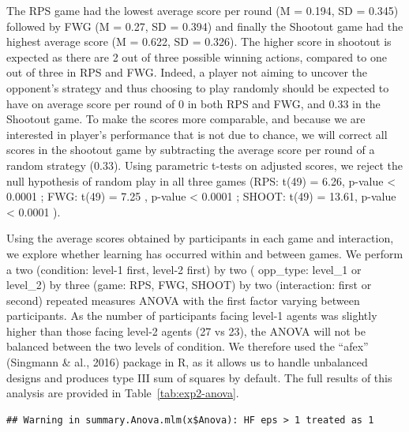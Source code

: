 \documentclass[man,floatsintext]{apa6}
\begin{document}
The RPS game had the lowest average score per round (M = 0.194, SD = 0.345) followed by FWG (M = 0.27, SD = 0.394) and finally the Shootout game had the highest average score (M = 0.622, SD = 0.326). The higher score in shootout is expected as there are 2 out of three possible winning actions, compared to one out of three in RPS and FWG. Indeed, a player not aiming to uncover the opponent's strategy and thus choosing to play randomly should be expected to have on average score per round of 0 in both RPS and FWG, and 0.33 in the Shootout game. To make the scores more comparable, and because we are interested in player's performance that is not due to chance, we will correct all scores in the shootout game by subtracting the average score per round of a random strategy (0.33). Using parametric t-tests on adjusted scores, we reject the null hypothesis of random play in all three games (RPS: t(49) = 6.26, p-value \textless{} 0.0001 ; FWG: t(49) = 7.25 , p-value \textless{} 0.0001 ; SHOOT: t(49) = 13.61, p-value \textless{} 0.0001 ).

Using the average scores obtained by participants in each game and interaction, we explore whether learning has occurred within and between games. We perform a two (condition: level-1 first, level-2 first) by two ( opp\_type: level\_1 or level\_2) by three (game: RPS, FWG, SHOOT) by two (interaction: first or second) repeated measures ANOVA with the first factor varying between participants. As the number of participants facing level-1 agents was slightly higher than those facing level-2 agents (27 vs 23), the ANOVA will not be balanced between the two levels of condition. We therefore used the ``afex'' (Singmann \& al., 2016) package in R, as it allows us to handle unbalanced designs and produces type III sum of squares by default. The full results of this analysis are provided in Table~\ref{tab:exp2-anova}.

\begin{verbatim}
## Warning in summary.Anova.mlm(x$Anova): HF eps > 1 treated as 1
\end{verbatim}
\end{document}
